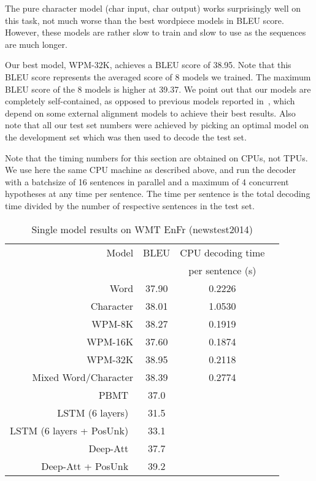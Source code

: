 The pure character model (char input, char output) works surprisingly
well on this task, not much worse than the best wordpiece models in BLEU 
score. However, these models are rather slow to train and slow to use as the 
sequences are much longer.

Our best model, WPM-32K, achieves a BLEU score of 38.95. Note that this
BLEU score represents the averaged score of 8 models we trained. The maximum
BLEU score of the 8 models is higher at 39.37.  We point out
that our models are completely self-contained, as opposed to previous models
reported in~\cite{DBLP:journals/corr/ZhouCWLX16}, which depend on
some external alignment models to achieve their best results. Also note that
all our test set numbers were achieved by picking an optimal model on the
development set which was then used to decode the test set.

Note that the timing numbers for this section are obtained on CPUs, not TPUs.
We use here the same CPU machine as described above, and run the decoder with
a batchsize of 16 sentences in parallel and a maximum of 4 concurrent
hypotheses at any time per sentence. The time per sentence is the total
decoding time divided by the number of respective sentences in the test set.







\begin{table}[h!]
\caption{Single model results on WMT EnFr (newstest2014)}
\label{table:wmt_en_fr}
\centering
\begin{tabular}{r c c c }
\hline\hline Model     & BLEU        & CPU decoding time    \\
                 &             & per sentence (s) \\ \hline
       Word      & 37.90       & 0.2226           \\
       Character & 38.01       & 1.0530           \\
       WPM-8K    & 38.27       & 0.1919           \\
       WPM-16K   & 37.60       & 0.1874           \\
       WPM-32K   & 38.95       & 0.2118           \\

       Mixed Word/Character& 38.39 & 0.2774    \\\hline
       PBMT~\cite{durrani2014edinburgh} & 37.0  & \\
       LSTM (6 layers)~\cite{luong2015addressing} & 31.5   & \\
       LSTM (6 layers + PosUnk)~\cite{luong2015addressing} & 33.1   & \\
       Deep-Att~\cite{DBLP:journals/corr/ZhouCWLX16} & 37.7 &  \\
       Deep-Att + PosUnk~\cite{DBLP:journals/corr/ZhouCWLX16} & 39.2  & \\
\hline \end{tabular}
\end{table}




